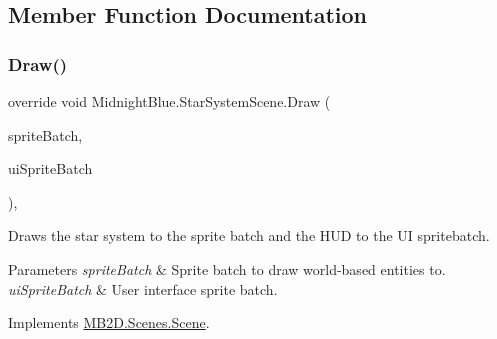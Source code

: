 \subsection{Member Function Documentation}
\hypertarget{class_midnight_blue_1_1_star_system_scene_ac3d90fb8d914d15b912f5da3cc1aa8a0}{}\label{class_midnight_blue_1_1_star_system_scene_ac3d90fb8d914d15b912f5da3cc1aa8a0} 
\subsubsection{\texorpdfstring{Draw()}{Draw()}}
{\footnotesize\ttfamily override void Midnight\+Blue.\+Star\+System\+Scene.\+Draw (\begin{DoxyParamCaption}\item[{Sprite\+Batch}]{sprite\+Batch,  }\item[{Sprite\+Batch}]{ui\+Sprite\+Batch }\end{DoxyParamCaption})\hspace{0.3cm}{\ttfamily [inline]}, {\ttfamily [virtual]}}



Draws the star system to the sprite batch and the H\+UD to the UI spritebatch. 


\begin{DoxyParams}{Parameters}
{\em sprite\+Batch} & Sprite batch to draw world-\/based entities to.\\
\hline
{\em ui\+Sprite\+Batch} & User interface sprite batch.\\
\hline
\end{DoxyParams}


Implements \hyperlink{class_m_b2_d_1_1_scenes_1_1_scene_a932d33071ecb4c5187367825dba72324}{M\+B2\+D.\+Scenes.\+Scene}.

